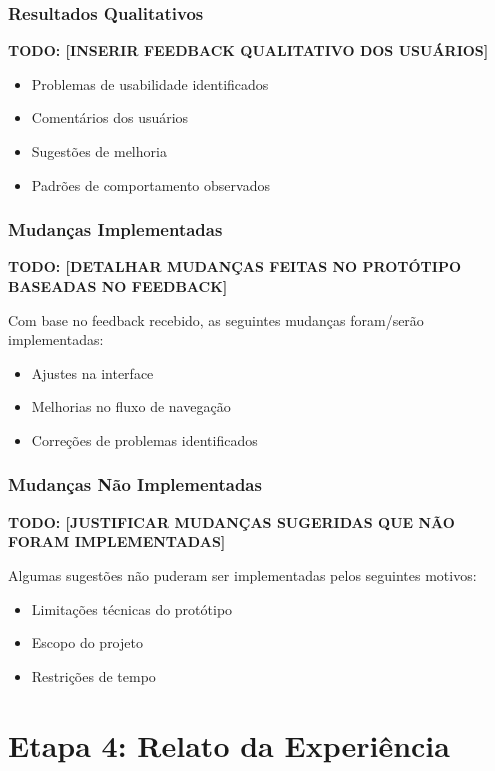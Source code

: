 \documentclass[12pt, a4paper]{report}
\begin{document}
\subsection{Resultados Qualitativos}

\textbf{TODO: [INSERIR FEEDBACK QUALITATIVO DOS USUÁRIOS]}
\begin{itemize}
    \item Problemas de usabilidade identificados
    \item Comentários dos usuários
    \item Sugestões de melhoria
    \item Padrões de comportamento observados
\end{itemize}

\subsection{Mudanças Implementadas}

\textbf{TODO: [DETALHAR MUDANÇAS FEITAS NO PROTÓTIPO BASEADAS NO FEEDBACK]}

Com base no feedback recebido, as seguintes mudanças foram/serão implementadas:
\begin{itemize}
    \item Ajustes na interface
    \item Melhorias no fluxo de navegação
    \item Correções de problemas identificados
\end{itemize}

\subsection{Mudanças Não Implementadas}

\textbf{TODO: [JUSTIFICAR MUDANÇAS SUGERIDAS QUE NÃO FORAM IMPLEMENTADAS]}

Algumas sugestões não puderam ser implementadas pelos seguintes motivos:
\begin{itemize}
    \item Limitações técnicas do protótipo
    \item Escopo do projeto
    \item Restrições de tempo
\end{itemize}

\chapter{Etapa 4: Relato da Experiência}
\label{ch:relato}
\end{document}

